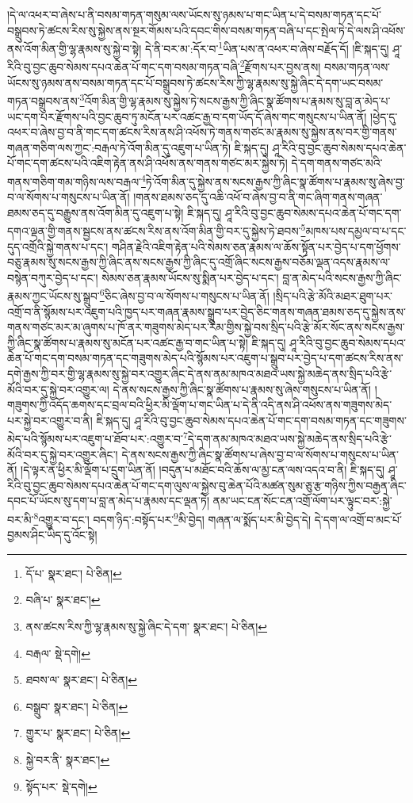 །དེ་ལ་འཕར་བ་ཞེས་པ་ནི་བསམ་གཏན་གསུམ་ལས་ཡོངས་སུ་ཉམས་པ་གང་ཡིན་པ་དེ་བསམ་གཏན་དང་པོ་བསྒྲུབས་ཏེ་ཚངས་རིས་སུ་སྐྱེས་ནས་སྔར་གོམས་པའི་དབང་གིས་བསམ་གཏན་བཞི་པ་དང་སྤེལ་ཏེ་དེ་ལས་ཤི་འཕོས་ནས་འོག་མིན་གྱི་ལྷ་རྣམས་སུ་སྐྱེ་བ་སྟེ། དེ་ནི་བར་མ་:དོར་བ་\footnote{དོ་པ་  སྣར་ཐང་།  པེ་ཅིན། }ཡིན་པས་ན་འཕར་བ་ཞེས་བརྗོད་དོ། །ཇི་སྐད་དུ། ཤཱ་རིའི་བུ་བྱང་ཆུབ་སེམས་དཔའ་ཆེན་པོ་གང་དག་བསམ་གཏན་བཞི་\footnote{བཞི་པ་  སྣར་ཐང་། }རྫོགས་པར་བྱས་ནས། བསམ་གཏན་ལས་ཡོངས་སུ་ཉམས་ནས་བསམ་གཏན་དང་པོ་བསྒྲུབས་ཏེ་ཚངས་རིས་ཀྱི་ལྷ་རྣམས་སུ་སྐྱེ་ཞིང་དེ་དག་ཡང་བསམ་གཏན་བསྒྲུབས་ནས་\footnote{ནས་ཚངས་རིས་ཀྱི་ལྷ་རྣམས་སུ་སྐྱེ་ཞིང་དེ་དག་  སྣར་ཐང་།  པེ་ཅིན། }འོག་མིན་གྱི་ལྷ་རྣམས་སུ་སྐྱེས་ཏེ་སངས་རྒྱས་ཀྱི་ཞིང་སྣ་ཚོགས་པ་རྣམས་སུ་བླ་ན་མེད་པ་ཡང་དག་པར་རྫོགས་པའི་བྱང་ཆུབ་ཏུ་མངོན་པར་འཚང་རྒྱ་བ་དག་ཡོད་དོ་ཞེས་གང་གསུངས་པ་ཡིན་ནོ། །ཕྱེད་དུ་འཕར་བ་ཞེས་བྱ་བ་ནི་གང་དག་ཚངས་རིས་ནས་ཤི་འཕོས་ཏེ་གནས་གཙང་མ་རྣམས་སུ་སྐྱེས་ནས་བར་གྱི་གནས་གཞན་གཅིག་ལས་ཀྱང་:བརྒལ་ཏེ་འོག་མིན་དུ་འཇུག་པ་ཡིན་ཏེ། ཇི་སྐད་དུ། ཤཱ་རིའི་བུ་བྱང་ཆུབ་སེམས་དཔའ་ཆེན་པོ་གང་དག་ཚངས་པའི་འཇིག་རྟེན་ནས་ཤི་འཕོས་ནས་གནས་གཙང་མར་སྐྱེས་ཏེ། དེ་དག་གནས་གཙང་མའི་གནས་གཅིག་གམ་གཉིས་ལས་བརྒལ་\footnote{བརྒལ་  སྡེ་དགེ། }ཏེ་འོག་མིན་དུ་སྐྱེས་ནས་སངས་རྒྱས་ཀྱི་ཞིང་སྣ་ཚོགས་པ་རྣམས་སུ་ཞེས་བྱ་བ་ལ་སོགས་པ་གསུངས་པ་ཡིན་ནོ། །གནས་ཐམས་ཅད་དུ་འཆི་འཕོ་བ་ཞེས་བྱ་བ་ནི་གང་ཞིག་གནས་གཞན་ཐམས་ཅད་དུ་བརྒྱུས་ནས་འོག་མིན་དུ་འཇུག་པ་སྟེ། ཇི་སྐད་དུ། ཤཱ་རིའི་བུ་བྱང་ཆུབ་སེམས་དཔའ་ཆེན་པོ་གང་དག་དགའ་ལྡན་གྱི་གནས་སྦྱངས་ནས་ཚངས་རིས་ནས་འོག་མིན་གྱི་བར་དུ་སྐྱེས་ཏེ་ཐབས་\footnote{ཐབས་ལ་  སྣར་ཐང་།  པེ་ཅིན། }མཁས་པས་དམྱལ་བ་པ་དང་དུད་འགྲོའི་སྐྱེ་གནས་པ་དང་། གཤིན་རྗེའི་འཇིག་རྟེན་པའི་སེམས་ཅན་རྣམས་ལ་ཆོས་སྟོན་པར་བྱེད་པ་དག་ཕྱོགས་བཅུ་རྣམས་སུ་སངས་རྒྱས་ཀྱི་ཞིང་ནས་སངས་རྒྱས་ཀྱི་ཞིང་དུ་འགྲོ་ཞིང་སངས་རྒྱས་བཅོམ་ལྡན་འདས་རྣམས་ལ་བསྙེན་བཀུར་བྱེད་པ་དང་། སེམས་ཅན་རྣམས་ཡོངས་སུ་སྨིན་པར་བྱེད་པ་དང་། བླ་ན་མེད་པའི་སངས་རྒྱས་ཀྱི་ཞིང་རྣམས་ཀྱང་ཡོངས་སུ་སྒྲུབ་\footnote{བསྒྲུབ་  སྣར་ཐང་།  པེ་ཅིན། }ཅིང་ཞེས་བྱ་བ་ལ་སོགས་པ་གསུངས་པ་ཡིན་ནོ། །སྲིད་པའི་རྩེ་མོའི་མཐར་ཐུག་པར་འགྲོ་བ་ནི་སྙོམས་པར་འཇུག་པའི་ཁྱད་པར་གཞན་རྣམས་སྒྲུབ་པར་བྱེད་ཅིང་གནས་གཞན་ཐམས་ཅད་དུ་སྐྱེས་ནས་གནས་གཙང་མར་མ་ཞུགས་པ་ཁོ་ནར་གཟུགས་མེད་པར་རིམ་གྱིས་སྐྱེ་བས་སྲིད་པའི་རྩེ་མོར་སོང་ནས་སངས་རྒྱས་ཀྱི་ཞིང་སྣ་ཚོགས་པ་རྣམས་སུ་མངོན་པར་འཚང་རྒྱ་བ་གང་ཡིན་པ་སྟེ། ཇི་སྐད་དུ། ཤཱ་རིའི་བུ་བྱང་ཆུབ་སེམས་དཔའ་ཆེན་པོ་གང་དག་བསམ་གཏན་དང་གཟུགས་མེད་པའི་སྙོམས་པར་འཇུག་པ་སྒྲུབ་པར་བྱེད་པ་དག་ཚངས་རིས་ནས་དགེ་རྒྱས་ཀྱི་བར་གྱི་ལྷ་རྣམས་སུ་སྐྱེ་བར་འགྱུར་ཞིང་དེ་ནས་ནམ་མཁའ་མཐའ་ཡས་སྐྱེ་མཆེད་ནས་སྲིད་པའི་རྩེ་མོའི་བར་དུ་སྐྱེ་བར་འགྱུར་ལ། དེ་ནས་སངས་རྒྱས་ཀྱི་ཞིང་སྣ་ཚོགས་པ་རྣམས་སུ་ཞེས་གསུངས་པ་ཡིན་ནོ། །གཟུགས་ཀྱི་འདོད་ཆགས་དང་བྲལ་བའི་ཕྱིར་མི་ལྡོག་པ་གང་ཡིན་པ་དེ་ནི་འདི་ནས་ཤི་འཕོས་ནས་གཟུགས་མེད་པར་སྐྱེ་བར་འགྱུར་བ་ནི། ཇི་སྐད་དུ། ཤཱ་རིའི་བུ་བྱང་ཆུབ་སེམས་དཔའ་ཆེན་པོ་གང་དག་བསམ་གཏན་དང་གཟུགས་མེད་པའི་སྙོམས་པར་འཇུག་པ་ཐོབ་པར་:འགྱུར་བ་\footnote{གྱུར་པ་  སྣར་ཐང་།  པེ་ཅིན། }དེ་དག་ནམ་མཁའ་མཐའ་ཡས་སྐྱེ་མཆེད་ནས་སྲིད་པའི་རྩེ་མོའི་བར་དུ་སྐྱེ་བར་འགྱུར་ཞིང་། དེ་ནས་སངས་རྒྱས་ཀྱི་ཞིང་སྣ་ཚོགས་པ་ཞེས་བྱ་བ་ལ་སོགས་པ་གསུངས་པ་ཡིན་ནོ། །དེ་ལྟར་ན་ཕྱིར་མི་ལྡོག་པ་དྲུག་ཡིན་ནོ། །བདུན་པ་མཐོང་བའི་ཆོས་ལ་མྱ་ངན་ལས་འདའ་བ་ནི། ཇི་སྐད་དུ། ཤཱ་རིའི་བུ་བྱང་ཆུབ་སེམས་དཔའ་ཆེན་པོ་གང་དག་ལུས་ལ་སྐྱེས་བུ་ཆེན་པོའི་མཚན་སུམ་ཅུ་རྩ་གཉིས་ཀྱིས་བརྒྱན་ཞིང་དབང་པོ་ཡོངས་སུ་དག་པ་བླ་ན་མེད་པ་རྣམས་དང་ལྡན་ཏེ། ནམ་ཡང་ངན་སོང་ངན་འགྲོ་ལོག་པར་ལྟུང་བར་:སྐྱེ་བར་མི་\footnote{སྐྱེ་བར་ནི་  སྣར་ཐང་། }འགྱུར་བ་དང་། བདག་ཉིད་:བསྟོད་པར་\footnote{སྟོད་པར་  སྡེ་དགེ། }མི་བྱེད། གཞན་ལ་སྨོད་པར་མི་བྱེད་དེ། དེ་དག་ལ་འགྲོ་བ་མང་པོ་བྱམས་ཤིང་ཡིད་དུ་འོང་སྟེ། 